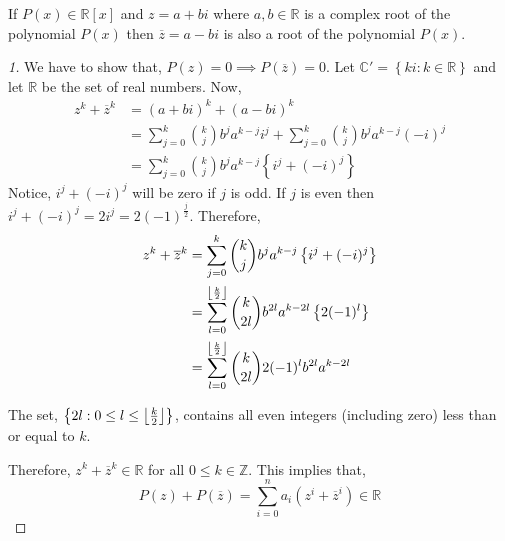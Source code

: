\begin{theorem}
    If $P(x) \in \mathbb{R}[x]$ and $z=a+bi$ where $a,b \in \mathbb{R}$ is a complex root of the polynomial 
    $P(x)$ then $\overline{z}=a-bi$ is also a root of the polynomial $P(x)$.
\end{theorem}
\begin{proof}[1]
    We have to show that, $P(z)=0 \implies P(\overline{z})=0$. Let $\mathbb{C}'=\left\{ki:k\in\mathbb{R}\right\}$ and let 
    $\mathbb{R}$ be the set of real numbers. Now,
    \begin{align*}
        z^{k} + \overline{z}^{k} &= (a+bi)^{k} + (a-bi)^{k} \\
                                 &= 
                                  \sum_{j=0}^{k} {k \choose j} b^{j} a^{k-j} i^{j} +
                                  \sum_{j=0}^{k} {k \choose j} b^{j}a^{k-j} (-i)^{j} \\
                                 &=
                                 \sum_{j=0}^{k} {k \choose j} b^{j} a^{k-j} \left\{i^{j} + (-i)^{j} 
                                 \right\}
    \end{align*}
    Notice, $i^{j} + (-i)^{j}$ will be zero if $j$ is odd. If $j$ is even then $i^{j} + (-i)^{j} = 2i^{j} = 2(-1)^{\frac{j}{2}}$. 
    Therefore,
    \begin{align*}
        z^{k} + \overline{z}^{k} &= 
                                 \sum_{j=0}^{k} {k \choose j} b^{j} a^{k-j} \left\{i^{j} + (-i)^{j} 
                                 \right\} \\ 
                                 &=
                                 \sum_{l=0}^{\left\lfloor \frac{k}{2} \right\rfloor} {k \choose 2l} b^{2l} a^{k-2l}
                                 \left\{2(-1)^{l}\right\}\\
                                 &= \sum_{l=0}^{\left\lfloor \frac{k}{2} \right\rfloor} {k \choose 2l} 2(-1)^{l} b^{2l} a^{k-2l}
    \end{align*}
    \begin{remark}
        The set, $\left\{ 2l : 0 \leq l \leq \left\lfloor \frac{k}{2} \right\rfloor\right\}$, contains all even integers (including zero) less than 
        or equal to $k$.
    \end{remark}
    Therefore, $z^{k} + \overline{z}^{k} \in \mathbb{R}$ for all $0\leq k\in \mathbb{Z}$. This implies that,
    \begin{equation*}
        P(z) + P(\overline{z}) = \sum_{i=0}^{n} a_{i} \left( z^{i} + \overline{z}^{i} \right) \in \mathbb{R} 
    \end{equation*}

\end{proof}
